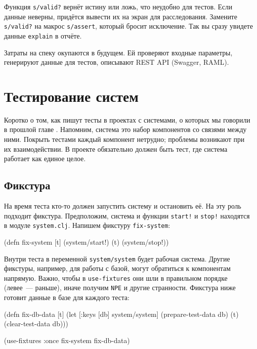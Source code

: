 Функция \verb|s/valid?| вернёт истину или ложь, что неудобно для тестов. Если
данные неверны, придётся вывести их на экран для расследования. Замените
\verb|s/valid?| на макрос \verb|s/assert|, который бросит исключение. Так
вы сразу увидете данные \verb|explain| в отчёте.


Затраты на спеку окупаются в будущем. Ей проверяют входные параметры, генерируют
данные для тестов, описывают REST API (Swagger, RAML).

\section{Тестирование систем}


Коротко о том, как пишут тесты в проектах с системами, о которых мы говорили в
прошлой главе . Напомним, система это набор компонентов со
связями между ними. Покрыть тестами каждый компонент нетрудно; проблемы
возникают при их взаимодействии. В проекте обязательно должен быть тест, где
система работает как единое целое.

\subsection{Фикстура}


На время теста кто-то должен запустить систему и остановить её. На эту роль
подходит фикстура. Предположим, система и функции \verb|start!| и
\verb|stop!| находятся в модуле \verb|system.clj|. Напишем фикстуру
\verb|fix-system|:

\begin{english}
  \begin{clojure}
(defn fix-system [t]
  (system/start!)
  (t)
  (system/stop!))
  \end{clojure}
\end{english}

Внутри теста в переменной \verb|system/system| будет рабочая система. Другие
фикстуры, например, для работы с базой, могут обратиться к компонентам
напрямую. Важно, чтобы в \verb|use-fixtures| они шли в правильном порядке
(левее~--- раньше), иначе получим \verb|NPE| и другие странности. Фикстура ниже
готовит данные в базе для каждого теста:


\begin{english}
  \begin{clojure}
(defn fix-db-data [t]
  (let [{:keys [db]} system/system]
    (prepare-test-data db)
    (t)
    (clear-test-data db)))

(use-fixtures :once fix-system fix-db-data)
  \end{clojure}
\end{english}

